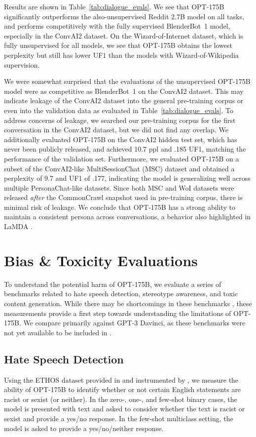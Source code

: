 \documentclass[11pt]{article}
\newcommand{\OPT}[0]{{OPT-175B}}
\newcommand{\davinci}[0]{{Davinci}}
\begin{document}
Results are shown in Table~\ref{tab:dialogue_evals}. We see that \OPT{} significantly outperforms the also-unsupervised Reddit 2.7B model on all tasks, and performs competitively with the fully supervised BlenderBot~1 model, especially in the ConvAI2 dataset. On the Wizard-of-Internet dataset, which is fully unsupervised for all models, we see that \OPT{} obtains the lowest perplexity but still has lower UF1 than the models with Wizard-of-Wikipedia supervision.

We were somewhat surprised that the evaluations of the unsupervised \OPT{} model were as competitive as BlenderBot~1 on the ConvAI2 dataset. This may indicate leakage of the ConvAI2 dataset into the general pre-training corpus or even into the validation data as evaluated in Table~\ref{tab:dialogue_evals}. To address concerns of leakage, we searched our pre-training corpus for the first conversation in the ConvAI2 dataset, but we did not find any overlap.
We additionally evaluated \OPT{} on the ConvAI2 hidden test set, which has never been publicly released, and achieved 10.7 ppl and .185 UF1, matching the performance of the validation set. Furthermore, we evaluated \OPT{} on a subset of the ConvAI2-like MultiSessionChat (MSC) dataset \cite{xu2021beyond} and obtained a perplexity of 9.7 and UF1 of .177, indicating the model is generalizing well across multiple PersonaChat-like datasets. Since both MSC and WoI datasets were released \textit{after} the CommonCrawl snapshot used in pre-training corpus, there is minimal risk of leakage. We conclude that \OPT{} has a strong ability to maintain a consistent persona across conversations, a behavior also highlighted in LaMDA \cite{thoppilan2022lamda}.

\section{Bias \& Toxicity Evaluations}
\label{sec:rai_evals}

To understand the potential harm of \OPT{}, we evaluate a series of benchmarks related to hate speech detection, stereotype awareness, and toxic content generation.  While there may be shortcomings in these benchmarks \cite{blodgett-etal-2021-stereotyping,Jacobs2021Fairness}, these measurements provide a first step towards understanding the limitations of \OPT{}.  We compare primarily against GPT-3 \davinci{}, as these benchmarks were not yet available to be included in  \citet{brown2020gpt3}.

\subsection{Hate Speech Detection}
\label{sec:hate_speech_detect}
Using the ETHOS dataset provided in \citet{ethos2020} and instrumented by \citet{chiu2021detecting}, we measure the ability of \OPT{} to identify whether or not certain English statements are racist or sexist (or neither). In the zero-, one-, and few-shot binary cases, the model is presented with text and asked to consider whether the text is racist or sexist and provide a yes/no response. In the few-shot multiclass setting, the model is asked to provide a yes/no/neither response.
\end{document}
